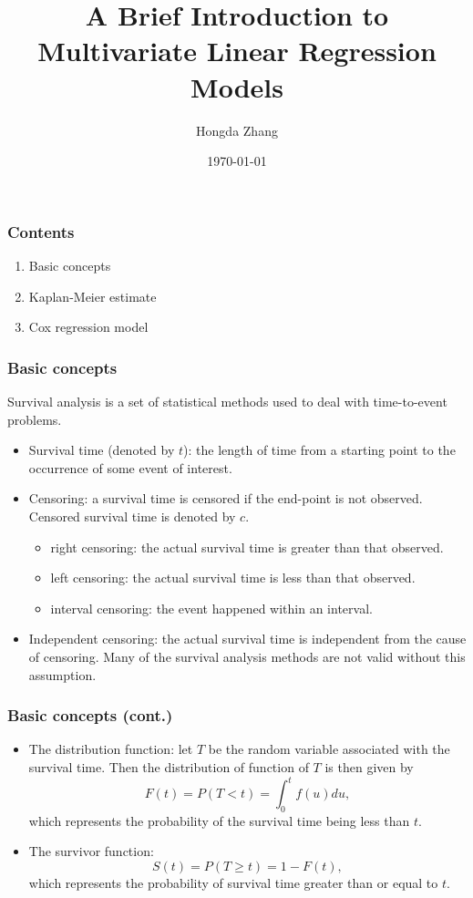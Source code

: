 \documentclass{beamer}
\title[]{A Brief Introduction to Multivariate Linear Regression Models}
\author[Hongda Zhang]{Hongda Zhang}
\institute{Nanjing University}
\date{\today}
\begin{document}
	\begin{frame}
		\titlepage
	\end{frame}
	
	\begin{frame}
		\frametitle{Contents}
		\begin{enumerate}
			\item Basic concepts
			\item Kaplan-Meier estimate
			\item Cox regression model
		\end{enumerate}
	\nocite{*}
	\end{frame}

	\begin{frame}
		\frametitle{Basic concepts}
		Survival analysis is a set of statistical methods used to deal with time-to-event problems.
		\begin{itemize}
			\item Survival time (denoted by $t$): the length of time from a starting point to the occurrence of some event of interest. 
			\item Censoring: a survival time is censored if the end-point is not observed. Censored survival time is denoted by $c$.
				\begin{itemize}
					\item right censoring: the actual survival time is greater than that observed.\\
					\item left censoring: the actual survival time is less than that observed.\\
					\item interval censoring: the event happened within an interval.
				\end{itemize}
			\item Independent censoring: the actual survival time is independent from the cause of censoring. Many of the survival analysis methods are not valid without this assumption.
		\end{itemize}
	\end{frame}

	\begin{frame}
		\frametitle{Basic concepts (cont.)}
		\begin{itemize}
			\item The distribution function: let $T$ be the random variable associated with the survival time. Then the distribution of function of $T$ is then given by 
			\[ F( t ) = P( T < t ) = \int_{ 0 }^{ t } f( u ) du,  \]
			which represents the probability of the survival time being less than $t$.
			\item The survivor function:
			\[ S(t) = P( T \geq t ) = 1 - F( t ), \]
			which represents the probability of survival time greater than or equal to $t$.
		\end{itemize}
	\end{frame}
\end{document}
